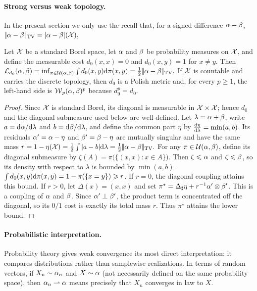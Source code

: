 \paragraph{Strong versus weak topology.}
In the present section we only use the recall that, for a signed difference $\alpha-\beta$, \(|\!| \alpha-\beta |\!|_{\operatorname{TV}}=|\alpha-\beta|(\mathcal{X}),\)
\begin{prop}\label{prop-rel-wass-tv}
Let $\mathcal{X}$ be a standard Borel space, let $\alpha$ and $\beta$ be probability measures on $\mathcal{X}$, and define the measurable cost $d_0(x,x)=0$ and $d_0(x,y)=1$ for $x\neq y$. Then
\(\mathcal{L}_{d_0}(\alpha,\beta) = \inf_{\pi\in\mathcal{U}(\alpha,\beta)}\int d_0(x,y)\mathrm{d}\pi(x,y) = \frac{1}{2}|\!| \alpha-\beta |\!|_{\operatorname{TV}}.\)
If $\mathcal{X}$ is countable and carries the discrete topology, then $d_0$ is a Polish metric and, for every $p\geq1$, the left-hand side is $\operatorname{\mathcal{W}}_p(\alpha,\beta)^p$ because $d_0^p=d_0$.
\end{prop}
\begin{proof}
Since $\mathcal{X}$ is standard Borel, its diagonal is measurable in $\mathcal{X}\times\mathcal{X}$; hence $d_0$ and the diagonal submeasure used below are well-defined.
Let $\lambda=\alpha+\beta$, write $a=\mathrm{d}\alpha/\mathrm{d}\lambda$ and $b=\mathrm{d}\beta/\mathrm{d}\lambda$, and define the common part $\eta$ by
\(\frac{\mathrm{d}\eta}{\mathrm{d}\lambda}=\min(a,b)\).
Its residuals $\alpha'=\alpha-\eta$ and $\beta'=\beta-\eta$ are mutually singular and have the same mass
\(r = 1-\eta(\mathcal{X}) = \frac12\int|a-b|\mathrm{d}\lambda = \frac12|\!| \alpha-\beta |\!|_{\operatorname{TV}}.\)
For any $\pi\in\mathcal{U}(\alpha,\beta)$, define its diagonal submeasure by
\(\zeta(A)=\pi\bigl(\{(x,x):x\in A\}\bigr)\).
Then $\zeta\leqslant\alpha$ and $\zeta\leqslant\beta$, so its density with respect to $\lambda$ is bounded by $\min(a,b)$.
$\int d_0(x,y)\mathrm{d}\pi(x,y)=1-\pi(\{x=y\})\geqslant r$.
If $r=0$, the diagonal coupling attains this bound. If $r>0$, let $\Delta(x)=(x,x)$ and set
$\pi^\star=\Delta_\sharp\eta+r^{-1}\alpha^{\prime}\otimes\beta^{\prime}$.
This is a coupling of $\alpha$ and $\beta$. Since $\alpha'\perp\beta'$, the product term is concentrated off the diagonal, so its $0/1$ cost is exactly its total mass $r$. Thus $\pi^\star$ attains the lower bound.
\end{proof}
\paragraph{Probabilistic interpretation.}
Probability theory gives weak convergence its most direct interpretation: it compares distributions rather than samplewise realizations. In terms of random vectors, if $X_n \sim \alpha_n$ and $X \sim \alpha$ (not necessarily defined on the same probability space), then $\alpha_n\rightharpoonup\alpha$ means precisely that $X_n$ converges in law to $X$.


